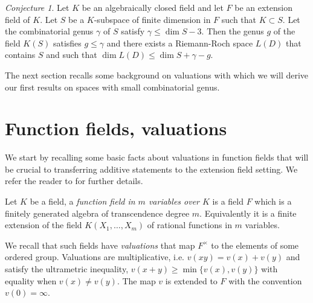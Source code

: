 \documentclass{article}
\theoremstyle{plain}
\theoremstyle{definition}
\theoremstyle{remark}
\newtheorem{conjecture}[thm]{Conjecture}
\renewcommand{\geq}{\geqslant}
\renewcommand{\leq}{\leqslant}
\begin{document}


\begin{conjecture}\label{conjecture}
{
  Let $K$ be an algebraically closed field and let $F$ be an extension
  field of $K$. Let $S$ be a
  $K$-subspace of finite dimension in $F$ such that $K\subset S$. Let the combinatorial genus
  $\gamma$ of $S$ satisfy $\gamma\leq \dim S -3$. Then 
  the genus $g$
  of the field $K(S)$ satisfies $g\leq\gamma$ and there exists a Riemann-Roch space
  $L(D)$ that contains $S$ and such that
  $\dim L(D)\leq\dim S +\gamma -g$.
}
\end{conjecture}


{The next section recalls some background on valuations
 with which we will derive our first results on spaces with small
 combinatorial genus.
}
\section{{Function fields, valuations}}\label{sec:valuations}

We start by recalling some basic facts about 
valuations in function fields that will be crucial to transferring
additive statements to the extension field setting.
We refer the reader to
\cite[Ch. 6]{Bourbaki_AlgComm5-6} for further details.


Let $K$ be a field, a {\em function field in $m$ variables over $K$}
is a field $F$ which is a finitely generated algebra of transcendence
degree $m$. Equivalently it is a finite extension of the field
$K(X_1, \ldots, X_m)$ of rational functions in $m$ variables.

We recall that such fields have {\em valuations} that map $F^{\times}$
to the elements of some ordered group. Valuations are multiplicative,
i.e. $v(xy) = v(x) + v(y)$ and satisfy the ultrametric inequality,
$v(x+y) \geq \min \{v(x), v(y)\}$ with equality when $v(x) \neq v(y)$.
The map $v$ is extended to $F$ with the convention $v(0)=\infty$.

\end{document}
